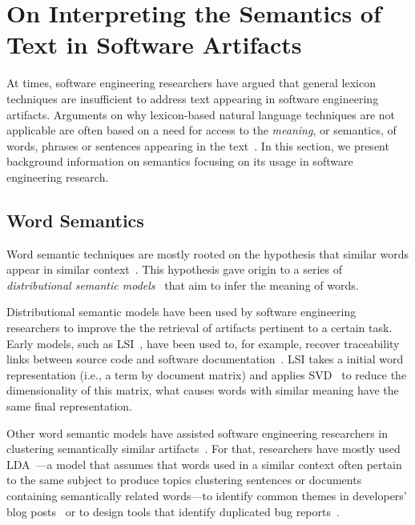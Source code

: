 

\section{On Interpreting the Semantics of Text in Software Artifacts}
\label{cp2:text-semantics}







At times, software engineering researchers have argued
that general lexicon techniques 
are insufficient to address text appearing in
software engineering artifacts. 
Arguments on why lexicon-based natural 
language techniques are not applicable are often based
on a need for access to the \textit{meaning}, or semantics, 
of words, phrases or sentences appearing in the text~\cite{jurafsky2014speech}.
In this section, 
we present background information on semantics focusing on
its usage in software engineering research.



\subsection{Word Semantics}

Word semantic techniques are mostly rooted on the hypothesis
that similar words appear in similar context~\cite{harris1954distributional}.
This hypothesis gave origin to a series of
\textit{distributional semantic models}~\cite{Ye2016} that aim to infer the meaning of words.



Distributional semantic models have been used by software engineering researchers 
to improve the 
the retrieval of artifacts pertinent to a certain task. 
Early models, such as \acf{LSI}~\cite{deerwester1990LSI}, 
have been used to, for example, recover traceability links between source code and
software documentation~\cite{marcus2003}.  
\acs{LSI} takes a initial word representation (i.e., a term by document matrix) and applies \acf{SVD}~\cite{klema1980SVD}
to reduce the dimensionality of this matrix, what causes 
words with similar meaning have the same final representation.


Other word semantic models have assisted software engineering researchers in clustering semantically similar artifacts~\cite{zhang2014, layman2016}. For that, researchers have mostly used
\acf{LDA}~\cite{blei2003latent}---a model that assumes that words used in a similar context often pertain to the same subject to produce topics clustering sentences or documents containing semantically related words---to
identify common themes in developers' blog posts~\cite{Pagano2011} or to design tools that identify duplicated bug reports~\cite{nguyen2012, Thung2014}.


